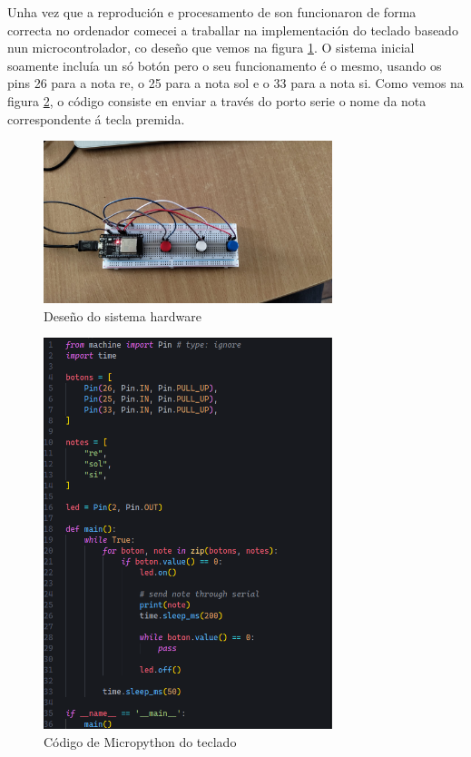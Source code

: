 Unha vez que a reprodución e procesamento de son funcionaron de forma correcta no ordenador comecei a traballar na implementación do teclado baseado nun microcontrolador, co deseño que vemos na figura \ref{fig:microcontrolador}. O sistema inicial soamente incluía un só botón pero o seu funcionamento é o mesmo, usando os pins 26 para a nota re, o 25 para a nota sol e o 33 para a nota si. Como vemos na figura \ref{fig:micropython}, o código consiste en enviar a través do porto serie o nome da nota correspondente á tecla premida.

\begin{figure}[hp!]
  \centering
  \includegraphics[width=0.75\textwidth]{imaxes/microcontrolador.jpeg}
  \caption{Deseño do sistema hardware}
  \label{fig:microcontrolador}
\end{figure}

\begin{figure}[hp!]
  \centering
  \includegraphics[width=0.75\textwidth]{imaxes/micropython.png}
  \caption{Código de Micropython do teclado}
  \label{fig:micropython}
\end{figure}

